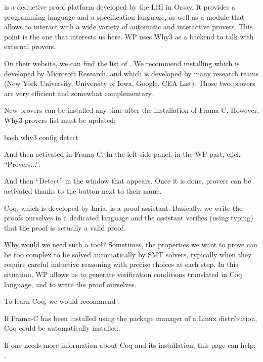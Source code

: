 

 is a deductive proof platform
developed by the LRI in Orsay. It
provides a programming language and a specification language, as well as
a module that allows to interact with a wide variety of automatic and
interactive provers. This point is the one that interests us here. WP uses
Why3 as a backend to talk with external provers.


On their website, we can find the list of
.
We recommend installing
 which is
developed by Microsoft Research, and
 which is developed by many
research teams (New York University, University of Iowa, Google, CEA
List). Those two provers are very efficient and somewhat complementary.


New provers can be installed any time after the installation of Frama-C.
However, Why3 provers list must be updated:

\begin{CodeBlock}{bash}
why3 config detect
\end{CodeBlock}

And then activated in Frama-C. In the left-side panel, in the WP part,
click ``Provers...'':




And then ``Detect'' in the window that appears. Once it is done, provers
can be activated thanks to the button next to their name.






Coq, which is developed by Inria, is a proof assistant. Basically, we
write the proofs ourselves in a dedicated language and the assistant
verifies (using typing) that the proof is actually a valid proof.



Why would we need such a tool? Sometimes, the properties we want to
prove can be too complex to be solved automatically by SMT solvers,
typically when they require careful inductive reasoning with precise
choices at each step. In this situation, WP allows us to generate
verification conditions translated in Coq language, and to write the
proof ourselves.




To learn Coq, we would recommend
.



\begin{Information}
  If Frama-C has been installed using the package manager of a Linux
  distribution, Coq could be automatically installed.
\end{Information}


If one needs more information about Coq and its installation, this page
can help: .

